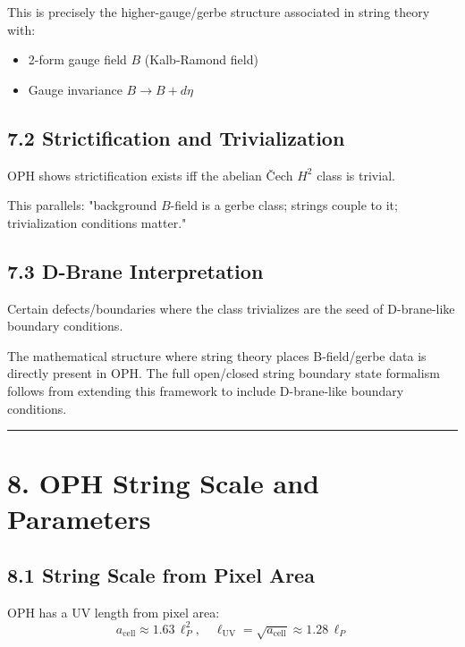 This is precisely the higher-gauge/gerbe structure associated in string theory with:

\begin{itemize}
\tightlist
\item
  2-form gauge field \(B\) (Kalb-Ramond field)
\item
  Gauge invariance \(B \to B + d\eta\)
\end{itemize}

\subsection{7.2 Strictification and Trivialization}\label{72-strictification-and-trivialization}

OPH shows strictification exists iff the abelian \v{C}ech \(H^2\) class is trivial.

This parallels: "background \(B\)-field is a gerbe class; strings couple to it; trivialization conditions matter."

\subsection{7.3 D-Brane Interpretation}\label{73-d-brane-interpretation}

Certain defects/boundaries where the class trivializes are the seed of D-brane-like boundary conditions.

The mathematical structure where string theory places B-field/gerbe data is directly present in OPH. The full open/closed string boundary state formalism follows from extending this framework to include D-brane-like boundary conditions.

\begin{center}\rule{0.5\linewidth}{0.5pt}\end{center}

\section{8. OPH String Scale and Parameters}\label{8-oph-string-scale-and-parameters}

\subsection{8.1 String Scale from Pixel Area}\label{81-string-scale-from-pixel-area}

OPH has a UV length from pixel area: \[a_{\text{cell}} \approx 1.63 \, \ell_P^2, \quad \ell_{\text{UV}} = \sqrt{a_{\text{cell}}} \approx 1.28 \, \ell_P\]

